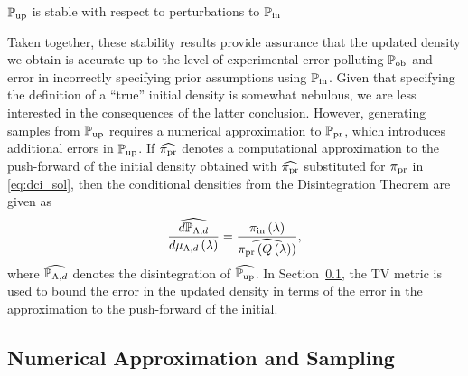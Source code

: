 \begin{thm}
  $\operatorname*{\mathbb{P}_{up}}$ is stable with respect to perturbations to $\operatorname*{\mathbb{P}_{in}}$
  \label{thm:stableinitial}
\end{thm}

Taken together, these stability results provide assurance that the updated density we obtain is accurate up to the level of experimental error polluting $\operatorname*{\mathbb{P}_{ob}}$ and error in incorrectly specifying prior assumptions using $\operatorname*{\mathbb{P}_{in}}$.
Given that specifying the definition of a ``true'' initial density is somewhat nebulous, we are less interested in the consequences of the latter conclusion.
However, generating samples from $\operatorname*{\mathbb{P}_{up}}$ requires a numerical approximation to $\operatorname*{\mathbb{P}_{pr}}$, which introduces additional errors in $\operatorname*{\mathbb{P}_{up}}$.
If $\widehat{\operatorname*{\pi_{pr}}}$ denotes a computational approximation to the push-forward of the initial density obtained with $\widehat{\operatorname*{\pi_{pr}}}$ substituted for $\operatorname*{\pi_{pr}}$ in \eqref{eq:dci_sol}, then the conditional densities from the Disintegration Theorem are given as
\[
\frac{\widehat{d\mathbb{P}_{{\Lambda}, d}}}{d\mu_{{\Lambda}, d}\left ( \lambda \right )} = \frac{\operatorname*{\pi_{in}}\left ( \lambda \right )}{ \widehat{\operatorname*{\pi_{pr}}\left ( Q\left ( \lambda \right ) \right )} },
\]
where $\widehat{\mathbb{P}_{{\Lambda}, d}}$ denotes the disintegration of $\widehat{\operatorname*{\mathbb{P}_{up}}}$.
In Section~\ref{sec:approx}, the TV metric is used to bound the error in the updated density in terms of the error in the approximation to the push-forward of the initial.



\subsection{Numerical Approximation and Sampling}\label{sec:approx}
%
%
%
%


